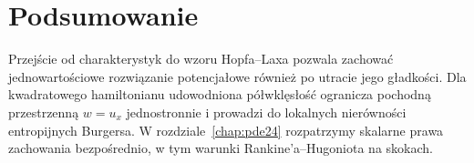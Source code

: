 \section{Podsumowanie}
Przejście od charakterystyk do wzoru Hopfa--Laxa
pozwala zachować jednowartościowe rozwiązanie
potencjałowe również po utracie jego gładkości.
Dla kwadratowego hamiltonianu udowodniona
półwklęsłość ogranicza pochodną przestrzenną
$w=u_x$ jednostronnie i prowadzi do lokalnych
nierówności entropijnych Burgersa.
W rozdziale~\ref{chap:pde24} rozpatrzymy
skalarne prawa zachowania bezpośrednio,
w tym warunki Rankine'a--Hugoniota na skokach.

